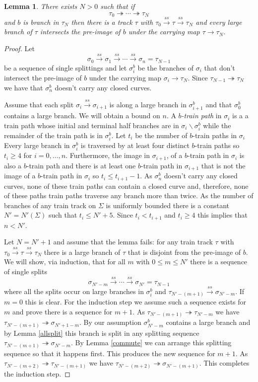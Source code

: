 \documentclass[11pt]{article}
\newtheorem{lemma}[thm]{Lemma}
\theoremstyle{remark}
\def\ss{{\overset{ss}\longrightarrow}}
\begin{document}
\begin{lemma}\label{traverse}
There exists $N>0$ such that if
$$\tau_0\twoheadrightarrow \cdots \twoheadrightarrow\tau_N$$
and $b$ is branch in $\tau_N$
then there is a track $\tau$ with $\tau_0 \ss \tau\ss \tau_N$ and every large branch of $\tau$ intersects the pre-image of $b$ under the carrying map $\tau\to \tau_N$.
\end{lemma}

\begin{proof}
Let
$$\sigma_0 \ss\sigma_1 \ss\cdots \ss\sigma_n = \tau_{N-1}$$
be a sequence of single splittings and let $\sigma^b_i$ be the branches of $\sigma_i$ that don't intersect the pre-image of $b$ under the carrying map $\sigma_i \to \tau_N$.  Since $\tau_{N-1} \twoheadrightarrow \tau_N$ we have that $\sigma^b_n$ doesn't carry any closed curves.

Assume that each split $\sigma_i \ss\sigma_{i+1}$ is along a large branch in $\sigma^b_{i+1}$ and that $\sigma_0^b$ contains a large branch.  We will obtain a bound on $n$. A {\em $b$-train path} in $\sigma_i$ is a a train path whose initial and terminal half branches are in $\sigma_i \smallsetminus \sigma^b_i$ while the remainder of the train path is in $\sigma^b_i$. Let $t_i$ be the number of $b$-train paths in $\sigma_i$
 Every large branch in $\sigma^b_i$ is traversed by at least four distinct $b$-train paths so $t_i \ge 4$ for $i = 0, \dots, n$. Furthermore, the image in $\sigma_{i+1}$, of a $b$-train path in $\sigma_i$ is also a $b$-train path and there is at least one $b$-train path in $\sigma_{i+1}$ that is not the image of a $b$-train path in $\sigma_i$ so $t_i \le t_{i+1} -1$.
As $\sigma^b_n$ doesn't carry any closed curves, none of these train paths can contain a closed curve and, therefore, none of these paths train paths traverse any branch more than twice. As the number of branches of any train track on $\Sigma$ is uniformly bounded  there is a constant $N' = N'(\Sigma)$ such that $t_i \le N'+5$. Since $t_i < t_{i+1}$ and $t_i \ge 4$ this implies that $n < N'$.

Let $N = N'+1$ and assume that the lemma fails: for any train track $\tau$ with $\tau_0 \ss \tau \ss \tau_N$ there is a large branch of $\tau$ that is disjoint from the pre-image of $b$. 
We will show, via induction, that for all $m$ with $0\le m \le N'$ there is a sequence of single splits
$$\sigma_{N'-m} \ss \cdots \ss \sigma_{N'} =\tau_{N-1}$$
where all the splits occur on large branches in $\sigma^b_i$
and $\tau_{N'-(m+1)} \ss \sigma_{N'-m}$.
If $m=0$ this is clear. For the induction step we assume such a sequence exists for $m$ and prove there is a sequence for $m+1$.
 As $\tau_{N'-(m+1)} \twoheadrightarrow \tau_{N'-m}$ we have $\tau_{N'-(m+1)} \twoheadrightarrow \sigma_{N'+1-m}$.
  By our assumption $\sigma^b_{N'-m}$ contains a large branch and by Lemma \ref{allsplit} this branch is split in any splitting sequence $\tau_{N'-(m+1)} \twoheadrightarrow \sigma_{N'-m}$.
  By Lemma \ref{commute} we can arrange this splitting sequence so that it happens first.  This produces the new sequence for $m+1$. As $\tau_{N'-(m+2)} \twoheadrightarrow \tau_{N'-(m+1)}$ we have $\tau_{N'-(m+2)} \twoheadrightarrow \sigma_{N'-(m+1)}$.
  This completes the induction step.


\end{proof}
\end{document}
